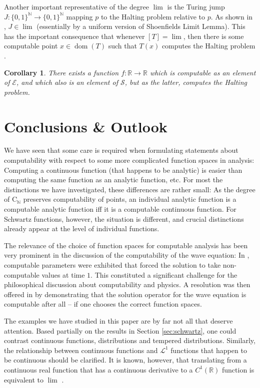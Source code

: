 \documentclass{eptcs-modified}
\newtheorem{corollary}[theorem]{Corollary}
\newcommand{\Wd}[1]{\left[#1\right]}
\newcommand{\dom}{\operatorname{dom}}
\newcommand{\Cantor}{{\{0, 1\}^\mathbb{N}}}
\newcommand{\C}{\textrm{C}}
\newcommand{\EE}{\mathcal E}
\newcommand{\SF}{\mathcal S}
\begin{document}
			Another important representative of the degree $\lim$ is the Turing jump $J : \Cantor \to \Cantor$ mapping $p$ to the Halting problem relative to $p$.
			As shown in \cite{brattka2}, $J \in \lim$ (essentially by a uniform version of Shoenfields Limit Lemma).
			This has the important consequence that whenever $\Wd{T} = \lim$, then there is some computable point $x \in \dom(T)$ such that $T(x)$ computes the Halting problem \cite{brattka11}.

			\begin{corollary}
				There exists a function $f : \mathbb{R} \to \mathbb{R}$ which is computable as an element of $\EE$, and which also is an element of $\SF$, but as the latter, computes the Halting problem.
			\end{corollary}

	\section{Conclusions \& Outlook}
		We have seen that some care is required when formulating statements about computability with respect to some more complicated function spaces in analysis:
		Computing a continuous function (that happens to be analytic) is easier than computing the same function as an analytic function, etc.
		For most the distinctions we have investigated, these differences are rather small:
		As the degree of $\C_\mathbb{N}$ preserves computability of points, an individual analytic function is a computable analytic function iff it is a computable continuous function.
		For Schwartz functions, however, the situation is different, and crucial distinctions already appear at the level of individual functions.

		The relevance of the choice of function spaces for computable analysis has been very prominent in the discussion of the computability of the wave equation:
		In \cite{pourel2,pourel3}, computable parameters were exhibited that forced the solution to take non-computable values at time $1$.
		This constituted a significant challenge for the philosophical discussion about computability and physics.
		A resolution was then offered in \cite{zhong2} by demonstrating that the solution operator for the wave equation is computable after all -- if one chooses the correct function spaces.

		The examples we have studied in this paper are by far not all that deserve attention.
		Based partially on the results in Section \ref{sec:schwartz}, one could contrast continuous functions, distributions and tempered distributions.
		Similarly, the relationship between continuous functions and $\mathcal{L}^1$ functions that happen to be continuous should be clarified.
		It is known, however, that translating from a continuous real function that has a continuous derivative to a $C^1(\mathbb{R})$ function is equivalent to $\lim$ \cite{stein}.
\end{document}
